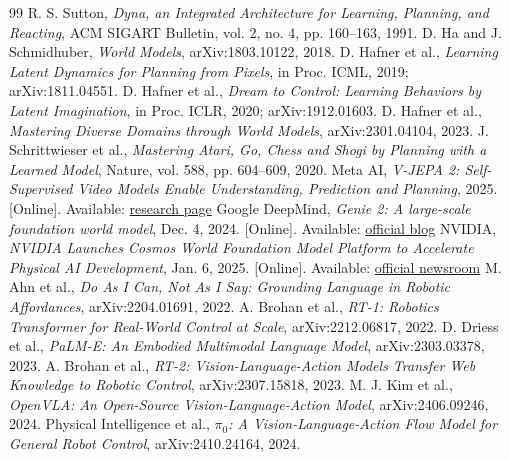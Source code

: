 \begin{thebibliography}{99}
\setlength{\itemsep}{0.1em}
\setlength{\parsep}{0pt}
\scriptsize
{} R. S. Sutton, \emph{Dyna, an Integrated Architecture for Learning, Planning, and Reacting}, ACM SIGART Bulletin, vol. 2, no. 4, pp. 160--163, 1991.
 D. Ha and J. Schmidhuber, \emph{World Models}, arXiv:1803.10122, 2018.
 D. Hafner et al., \emph{Learning Latent Dynamics for Planning from Pixels}, in Proc. ICML, 2019; arXiv:1811.04551.
 D. Hafner et al., \emph{Dream to Control: Learning Behaviors by Latent Imagination}, in Proc. ICLR, 2020; arXiv:1912.01603.
 D. Hafner et al., \emph{Mastering Diverse Domains through World Models}, arXiv:2301.04104, 2023.
 J. Schrittwieser et al., \emph{Mastering Atari, Go, Chess and Shogi by Planning with a Learned Model}, Nature, vol. 588, pp. 604--609, 2020.
 Meta AI, \emph{V-JEPA 2: Self-Supervised Video Models Enable Understanding, Prediction and Planning}, 2025. [Online]. Available: \href{https://ai.meta.com/research/publications/v-jepa-2-self-supervised-video-models-enable-understanding-prediction-and-planning/}{research page}
 Google DeepMind, \emph{Genie 2: A large-scale foundation world model}, Dec. 4, 2024. [Online]. Available: \href{https://deepmind.google/discover/blog/genie-2-a-large-scale-foundation-world-model/}{official blog}
 NVIDIA, \emph{NVIDIA Launches Cosmos World Foundation Model Platform to Accelerate Physical AI Development}, Jan. 6, 2025. [Online]. Available: \href{https://nvidianews.nvidia.com/news/nvidia-launches-cosmos-world-foundation-model-platform-to-accelerate-physical-ai-development}{official newsroom}
 M. Ahn et al., \emph{Do As I Can, Not As I Say: Grounding Language in Robotic Affordances}, arXiv:2204.01691, 2022.
 A. Brohan et al., \emph{RT-1: Robotics Transformer for Real-World Control at Scale}, arXiv:2212.06817, 2022.
 D. Driess et al., \emph{PaLM-E: An Embodied Multimodal Language Model}, arXiv:2303.03378, 2023.
 A. Brohan et al., \emph{RT-2: Vision-Language-Action Models Transfer Web Knowledge to Robotic Control}, arXiv:2307.15818, 2023.
 M. J. Kim et al., \emph{OpenVLA: An Open-Source Vision-Language-Action Model}, arXiv:2406.09246, 2024.
 Physical Intelligence et al., \emph{$\pi_0$: A Vision-Language-Action Flow Model for General Robot Control}, arXiv:2410.24164, 2024.

\end{thebibliography}
